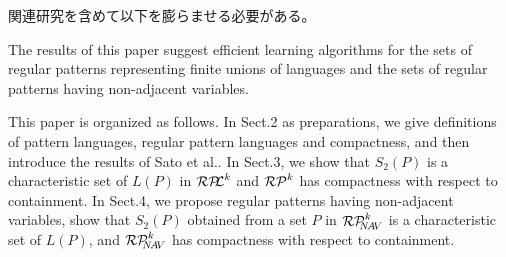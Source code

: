 {\color{red} 関連研究を含めて以下を膨らませる必要がある。}

The results of this paper suggest efficient learning algorithms for the sets of regular patterns representing finite unions of languages and the sets of regular patterns having non-adjacent variables.
%


This paper is organized as follows.
In Sect.2 as preparations, we give definitions of pattern languages, regular pattern languages and compactness, and then introduce the results of Sato et al.\cite{Sato1}.
In Sect.3, we show that $S_{2}(P)$ is a characteristic set of $L(P)$ in $\mathcal{RP\!\!L}^{k}$ and $\mathcal{RP}^{k}$ has compactness with respect to containment.
In Sect.4, we propose regular patterns having non-adjacent variables, show that $S_2(P)$ obtained from a set $P$ in $\mathcal{RP}^{k}_{\!\!\!N\!A\!V}$ is a characteristic set of $L(P)$, and $\mathcal{RP}^{k}_{\!\!\!N\!A\!V}$ has compactness with respect to containment.

